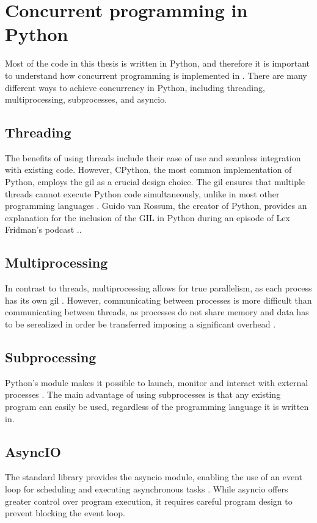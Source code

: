 \section{Concurrent programming in Python}
Most of the code in this thesis is written in Python, and therefore it is important to understand how concurrent programming is implemented in \py.
There are many different ways to achieve concurrency in Python, including threading, multiprocessing, subprocesses, and \gls{asyncio}.

\subsection{Threading}
The benefits of using threads include their ease of use and seamless integration with existing code. However, CPython, the most common implementation of Python, employs the \gls{gil} as a crucial design choice. The \gls{gil} ensures that multiple threads cannot execute Python code simultaneously, unlike in most other programming languages \cite{ajitsariaWhatPythonGlobal2018}. Guido van Rossum, the creator of Python, provides an explanation for the inclusion of the GIL in Python during an episode of Lex Fridman's podcast \cite{lexfridmanGuidoVanRossum2022}..

\subsection{Multiprocessing}
In contrast to threads, multiprocessing allows for true parallelism, as each process has its own \gls{gil} \cite{ajitsariaWhatPythonGlobal2018}.
However, communicating between processes is more difficult than communicating between threads, as processes do not share memory and data has to be serealized in order be transferred imposing a significant overhead \cite{pythonsoftwarefoundationMultiprocessingProcessbasedParallelism}.

\subsection{Subprocessing}
Python's  module makes it possible to launch, monitor and interact with external processes \cite{pythonsoftwarefoundationSubprocessSubprocessManagement}.
The main advantage of using subprocesses is that any existing program can easily be used, regardless of the programming language it is written in.

\subsection{AsyncIO}
The \py standard library provides the \gls{asyncio} module, enabling the use of an event loop for scheduling and executing asynchronous tasks \cite{pythonsoftwarefoundationAsyncioAsynchronous}.
While \gls{asyncio} offers greater control over program execution, it requires careful program design to prevent blocking the event loop.


